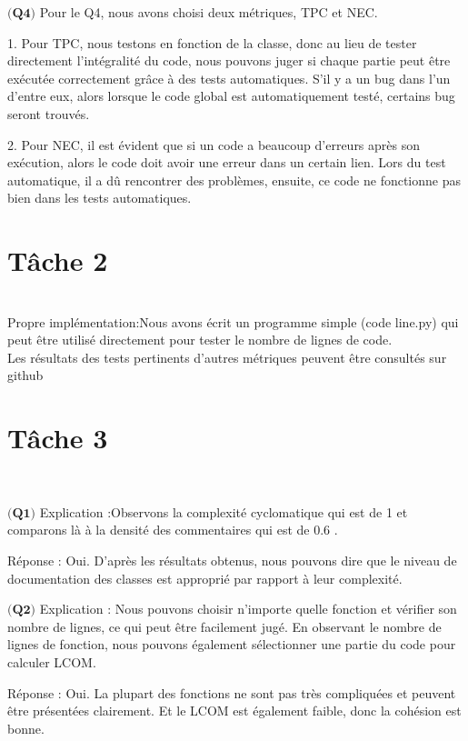 \documentclass{article}
\begin{document}
\item$\textbf{(Q4)}$
Pour le Q4, nous avons choisi deux métriques, TPC et NEC.

1. Pour TPC, nous testons en fonction de la classe, donc au lieu de tester directement l'intégralité du code, nous pouvons juger si chaque partie peut être exécutée correctement grâce à des tests automatiques. S'il y a un bug dans l'un d'entre eux, alors lorsque le code global est automatiquement testé, certains bug seront trouvés.

2. Pour NEC, il est évident que si un code a beaucoup d'erreurs après son exécution, alors le code doit avoir une erreur dans un certain lien. Lors du test automatique, il a dû rencontrer des problèmes, ensuite, ce code ne fonctionne pas bien dans les tests automatiques.\\

\section*{Tâche 2}\\
Propre implémentation:Nous avons écrit un programme simple (code line.py) qui peut être utilisé directement pour tester le nombre de lignes de code.\\
Les résultats des tests pertinents d'autres métriques peuvent être consultés sur github

\section*{Tâche 3}\\

\item$\textbf{(Q1)}$
Explication :Observons la complexité cyclomatique qui est de 1 et  comparons là à la densité des commentaires qui est de 0.6  . 

Réponse : Oui. D'après les résultats obtenus, nous pouvons dire que le niveau de documentation des classes est approprié par rapport à leur complexité.

\item$\textbf{(Q2)}$
Explication : Nous pouvons choisir n'importe quelle fonction et vérifier son nombre de lignes, ce qui peut être facilement jugé. En observant le nombre de lignes de fonction, nous pouvons également sélectionner une partie du code pour calculer LCOM.

Réponse : Oui. La plupart des fonctions ne sont pas très compliquées et peuvent être présentées clairement. Et le LCOM est également faible, donc la cohésion est bonne.
\end{document}
